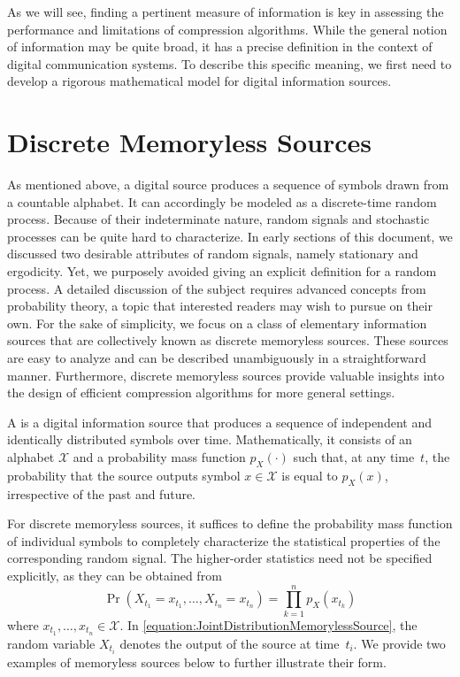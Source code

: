 As we will see, finding a pertinent measure of information is key in assessing the performance and limitations of compression algorithms.
While the general notion of information may be quite broad, it has a precise definition in the context of digital communication systems.
To describe this specific meaning, we first need to develop a rigorous mathematical model for digital information sources.


\section{Discrete Memoryless Sources}

As mentioned above, a digital source produces a sequence of symbols drawn from a countable alphabet.
It can accordingly be modeled as a discrete-time random process.
Because of their indeterminate nature, random signals and stochastic processes can be quite hard to characterize.
In early sections of this document, we discussed two desirable attributes of random signals, namely stationary and ergodicity.
Yet, we purposely avoided giving an explicit definition for a random process.
A detailed discussion of the subject requires advanced concepts from probability theory, a topic that interested readers may wish to pursue on their own.
For the sake of simplicity, we focus on a class of elementary information sources that are collectively known as discrete memoryless sources.
These sources are easy to analyze and can be described unambiguously in a straightforward manner.
Furthermore, discrete memoryless sources provide valuable insights into the design of efficient compression algorithms for more general settings.

\begin{definition}
A  is a digital information source that produces a sequence of independent and identically distributed symbols over time.
Mathematically, it consists of an alphabet $\mathcal{X}$ and a probability mass function $p_X(\cdot)$ such that, at any time~$t$, the probability that the source outputs symbol $x \in \mathcal{X}$ is equal to $p_X(x)$, irrespective of the past and future.
\end{definition}

For discrete memoryless sources, it suffices to define the probability mass function of individual symbols to completely characterize the statistical properties of the corresponding random signal.
The higher-order statistics need not be specified explicitly, as they can be obtained from
\begin{equation} \label{equation:JointDistributionMemorylessSource}
\Pr (X_{t_1} = x_{t_1}, \ldots, X_{t_n} = x_{t_n})
= \prod_{k = 1}^n p_X(x_{t_k})
\end{equation}
where $x_{t_1}, \ldots, x_{t_n} \in \mathcal{X}$.
In \eqref{equation:JointDistributionMemorylessSource}, the random variable $X_{t_i}$ denotes the output of the source at time~$t_i$.
We provide two examples of memoryless sources below to further illustrate their form.

